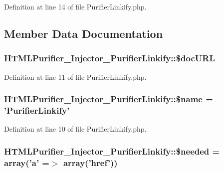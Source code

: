 Definition at line 14 of file Purifier\+Linkify.\+php.



\subsection{Member Data Documentation}
\hypertarget{classHTMLPurifier__Injector__PurifierLinkify_aec059e9f48b1f2dac2e8ca85ad7644ef}{
\subsubsection[{\$doc\+U\+R\+L}]{\setlength{\rightskip}{0pt plus 5cm}H\+T\+M\+L\+Purifier\+\_\+\+Injector\+\_\+\+Purifier\+Linkify\+::\$doc\+U\+R\+L}}\label{classHTMLPurifier__Injector__PurifierLinkify_aec059e9f48b1f2dac2e8ca85ad7644ef}


Definition at line 11 of file Purifier\+Linkify.\+php.

\hypertarget{classHTMLPurifier__Injector__PurifierLinkify_a52d19cc95bf3f5a4288439ed818e72e1}{
\subsubsection[{\$name}]{\setlength{\rightskip}{0pt plus 5cm}H\+T\+M\+L\+Purifier\+\_\+\+Injector\+\_\+\+Purifier\+Linkify\+::\$name = 'Purifier\+Linkify'}}\label{classHTMLPurifier__Injector__PurifierLinkify_a52d19cc95bf3f5a4288439ed818e72e1}


Definition at line 10 of file Purifier\+Linkify.\+php.

\hypertarget{classHTMLPurifier__Injector__PurifierLinkify_a569fa2c54469b9eddc354e7ad0e3d3bb}{
\subsubsection[{\$needed}]{\setlength{\rightskip}{0pt plus 5cm}H\+T\+M\+L\+Purifier\+\_\+\+Injector\+\_\+\+Purifier\+Linkify\+::\$needed = array('a' =$>$ array('href'))}}\label{classHTMLPurifier__Injector__PurifierLinkify_a569fa2c54469b9eddc354e7ad0e3d3bb}


